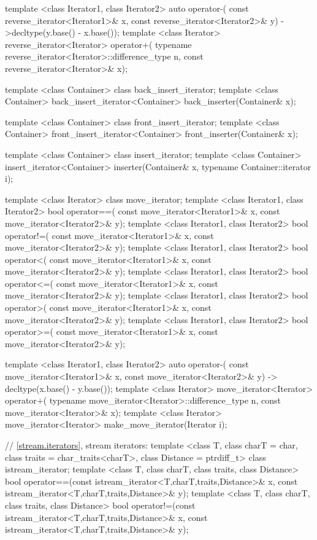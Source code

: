 \begin{codeblock}
{  template <class Iterator1, class Iterator2>
    auto operator-(
      const reverse_iterator<Iterator1>& x,
      const reverse_iterator<Iterator2>& y) ->decltype(y.base() - x.base());
  template <class Iterator>
    reverse_iterator<Iterator>
      operator+(
    typename reverse_iterator<Iterator>::difference_type n,
    const reverse_iterator<Iterator>& x);

  template <class Container> class back_insert_iterator;
  template <class Container>
    back_insert_iterator<Container> back_inserter(Container& x);

  template <class Container> class front_insert_iterator;
  template <class Container>
    front_insert_iterator<Container> front_inserter(Container& x);

  template <class Container> class insert_iterator;
  template <class Container>
    insert_iterator<Container> inserter(Container& x, typename Container::iterator i);

  template <class Iterator> class move_iterator;
  template <class Iterator1, class Iterator2>
    bool operator==(
      const move_iterator<Iterator1>& x, const move_iterator<Iterator2>& y);
  template <class Iterator1, class Iterator2>
    bool operator!=(
      const move_iterator<Iterator1>& x, const move_iterator<Iterator2>& y);
  template <class Iterator1, class Iterator2>
    bool operator<(
      const move_iterator<Iterator1>& x, const move_iterator<Iterator2>& y);
  template <class Iterator1, class Iterator2>
    bool operator<=(
      const move_iterator<Iterator1>& x, const move_iterator<Iterator2>& y);
  template <class Iterator1, class Iterator2>
    bool operator>(
      const move_iterator<Iterator1>& x, const move_iterator<Iterator2>& y);
  template <class Iterator1, class Iterator2>
    bool operator>=(
      const move_iterator<Iterator1>& x, const move_iterator<Iterator2>& y);

  template <class Iterator1, class Iterator2>
    auto operator-(
    const move_iterator<Iterator1>& x,
    const move_iterator<Iterator2>& y) -> decltype(x.base() - y.base());
  template <class Iterator>
    move_iterator<Iterator> operator+(
      typename move_iterator<Iterator>::difference_type n, const move_iterator<Iterator>& x);
  template <class Iterator>
    move_iterator<Iterator> make_move_iterator(Iterator i);

  // \ref{stream.iterators}, stream iterators:
  template <class T, class charT = char, class traits = char_traits<charT>,
      class Distance = ptrdiff_t>
  class istream_iterator;
  template <class T, class charT, class traits, class Distance>
    bool operator==(const istream_iterator<T,charT,traits,Distance>& x,
            const istream_iterator<T,charT,traits,Distance>& y);
  template <class T, class charT, class traits, class Distance>
    bool operator!=(const istream_iterator<T,charT,traits,Distance>& x,
            const istream_iterator<T,charT,traits,Distance>& y);

}
\end{codeblock}
